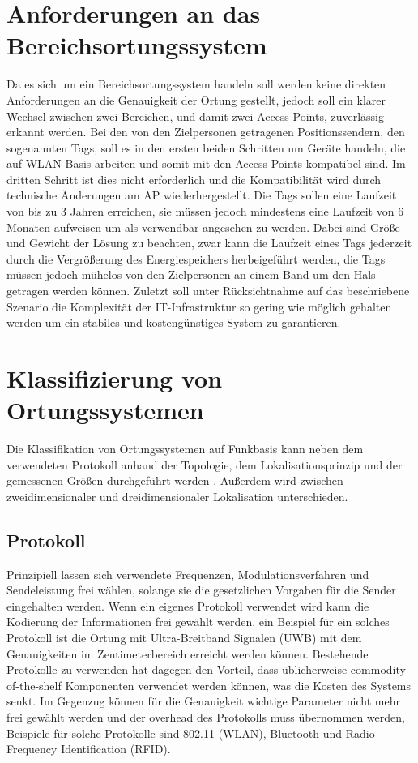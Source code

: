 \section{Anforderungen an das Bereichsortungssystem}
\label{ch:Einleitung:sec:Anforderungen}
Da es sich um ein Bereichsortungssystem handeln soll werden keine direkten Anforderungen an die Genauigkeit der Ortung gestellt, jedoch soll ein klarer Wechsel zwischen zwei Bereichen, und damit zwei Access Points, zuverlässig erkannt werden. 
Bei den von den Zielpersonen getragenen Positionssendern, den sogenannten Tags, soll es in den ersten beiden Schritten um Geräte handeln, die auf WLAN Basis arbeiten und somit mit den Access Points kompatibel sind.
Im dritten Schritt ist dies nicht erforderlich und die Kompatibilität wird durch technische Änderungen am AP wiederhergestellt.
Die Tags sollen eine Laufzeit von bis zu 3 Jahren erreichen, sie müssen jedoch mindestens eine Laufzeit von 6 Monaten aufweisen um als verwendbar angesehen zu werden. 
Dabei sind Größe und Gewicht der Lösung zu beachten, zwar kann die Laufzeit eines Tags jederzeit durch die Vergrößerung des Energiespeichers herbeigeführt werden, die Tags müssen jedoch mühelos von den Zielpersonen an einem Band um den Hals getragen werden können.
Zuletzt soll unter Rücksichtnahme auf das beschriebene Szenario die Komplexität der IT-Infrastruktur so gering wie möglich gehalten werden um ein stabiles und kostengünstiges System zu garantieren. 

\section{Klassifizierung von Ortungssystemen}
\label{ch:Einleitung:sec:Ortungssysteme}
Die Klassifikation von Ortungssystemen auf Funkbasis kann neben dem verwendeten Protokoll anhand der Topologie, dem Lokalisationsprinzip und der gemessenen Größen durchgeführt werden \cite{liu2007survey}.
Außerdem wird zwischen zweidimensionaler und dreidimensionaler Lokalisation unterschieden.

\subsection{Protokoll}
Prinzipiell lassen sich verwendete Frequenzen, Modulationsverfahren und Sendeleistung frei wählen, solange sie die gesetzlichen Vorgaben für die Sender eingehalten werden. Wenn ein eigenes Protokoll verwendet wird kann die Kodierung der Informationen frei gewählt werden, ein Beispiel für ein solches Protokoll ist die Ortung mit Ultra-Breitband Signalen (UWB) mit dem Genauigkeiten im Zentimeterbereich erreicht werden können. Bestehende Protokolle zu verwenden hat dagegen den Vorteil, dass üblicherweise commodity-of-the-shelf Komponenten verwendet werden können, was die Kosten des Systems senkt. Im Gegenzug können für die Genauigkeit wichtige Parameter nicht mehr frei gewählt werden und der overhead des Protokolls muss übernommen werden, Beispiele für solche Protokolle sind 802.11 (WLAN), Bluetooth und Radio Frequency Identification (RFID).

